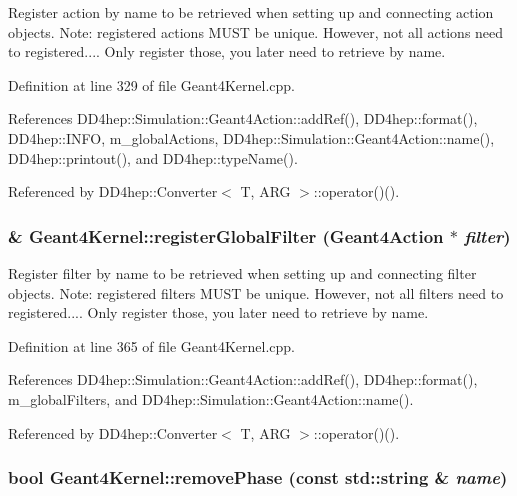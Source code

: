 Register action by name to be retrieved when setting up and connecting action objects. Note: registered actions MUST be unique. However, not all actions need to registered.... Only register those, you later need to retrieve by name. 

Definition at line 329 of file Geant4Kernel.cpp.

References DD4hep::Simulation::Geant4Action::addRef(), DD4hep::format(), DD4hep::INFO, m\_\-globalActions, DD4hep::Simulation::Geant4Action::name(), DD4hep::printout(), and DD4hep::typeName().

Referenced by DD4hep::Converter$<$ T, ARG $>$::operator()().\hypertarget{class_d_d4hep_1_1_simulation_1_1_geant4_kernel_a0690ca4b44a14133f0c8562eebac9613}{
\subsubsection[{registerGlobalFilter}]{ \& Geant4Kernel::registerGlobalFilter ({\bf Geant4Action} $\ast$ {\em filter})}}
\label{class_d_d4hep_1_1_simulation_1_1_geant4_kernel_a0690ca4b44a14133f0c8562eebac9613}


Register filter by name to be retrieved when setting up and connecting filter objects. Note: registered filters MUST be unique. However, not all filters need to registered.... Only register those, you later need to retrieve by name. 

Definition at line 365 of file Geant4Kernel.cpp.

References DD4hep::Simulation::Geant4Action::addRef(), DD4hep::format(), m\_\-globalFilters, and DD4hep::Simulation::Geant4Action::name().

Referenced by DD4hep::Converter$<$ T, ARG $>$::operator()().\hypertarget{class_d_d4hep_1_1_simulation_1_1_geant4_kernel_a3d2e1d38ae072b26c0a9124268065fbc}{
\subsubsection[{removePhase}]{\setlength{\rightskip}{0pt plus 5cm}bool Geant4Kernel::removePhase (const std::string \& {\em name})}}
\label{class_d_d4hep_1_1_simulation_1_1_geant4_kernel_a3d2e1d38ae072b26c0a9124268065fbc}


